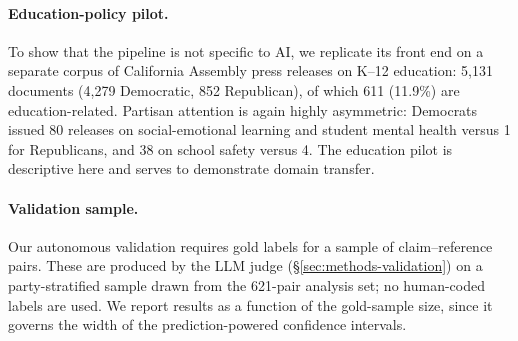 \paragraph{Education-policy pilot.} To show that the pipeline is not specific to AI, we replicate
its front end on a separate corpus of California Assembly press releases on K--12 education: 5{,}131
documents (4{,}279 Democratic, 852 Republican), of which 611 (11.9\%) are education-related.
Partisan attention is again highly asymmetric: Democrats issued 80 releases on social-emotional
learning and student mental health versus 1 for Republicans, and 38 on school safety versus 4. The
education pilot is descriptive here and serves to demonstrate domain transfer.

\paragraph{Validation sample.} Our autonomous validation requires gold labels for a sample of
claim--reference pairs. These are produced by the LLM judge (\S\ref{sec:methods-validation}) on a
party-stratified sample drawn from the 621-pair analysis set; no human-coded labels are used. We
report results as a function of the gold-sample size, since it governs the width of the
prediction-powered confidence intervals.

